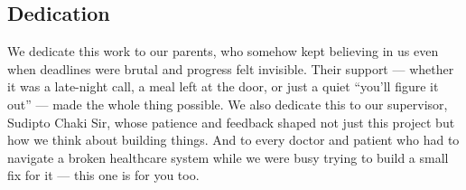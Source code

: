 

\begin{center}
    \section*{Dedication}
\end{center}
\large We dedicate this work to our parents, who somehow kept believing in us even when
deadlines were brutal and progress felt invisible. Their support --- whether it was
a late-night call, a meal left at the door, or just a quiet ``you'll figure it out'' ---
made the whole thing possible. We also dedicate this to our supervisor, Sudipto Chaki Sir, whose patience and feedback
shaped not just this project but how we think about building things. And to every
doctor and patient who had to navigate a broken healthcare system while we were busy
trying to build a small fix for it --- this one is for you too.